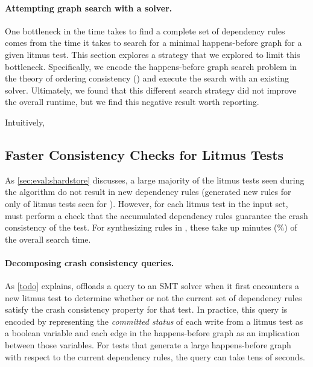 \paragraph{Attempting graph search with a \tord solver.}
One bottleneck in the time \depsynth takes to find a complete set of
dependency rules comes from the time it takes to search for a minimal
happens-before graph for a given litmus test.
This section explores a strategy that we explored to limit this bottleneck.
Specifically, we encode the happens-before graph search problem
in the theory of ordering consistency (\tord)
and execute the search with an existing \tord solver.
Ultimately, we found that this different search strategy did not 
improve the overall runtime, but we find this negative
result worth reporting.


Intuitively, %

\subsection{Faster Consistency Checks for Litmus Tests}
\label{s:improved-search}
As \cref{sec:eval:shardstore} discusses,
a large majority of the litmus tests seen during the \depsynth
algorithm do not result in new dependency rules
(\depsynth generated new rules for only \shardstoretestsused of \shardstoreinputtests
 litmus tests seen for \shardstore).
However, for each litmus test in the input set, \depsynth
must perform a check that the accumulated dependency rules
guarantee the crash consistency of the test.
For synthesizing rules in \shardstore,
these take up \shardstoreverificationminutes minutes (\shardstoreverificationpercent\%)
of the overall search time.

\paragraph{Decomposing crash consistency queries.}
As \cref{todo} explains, \depsynth offloads a query to an SMT
solver when it first encounters a new litmus test to determine
whether or not the current set of dependency rules satisfy the
crash consistency property for that test.
In practice, this query is encoded by representing the \textit{committed status}
of each write from a litmus test as a boolean variable
and each edge in the happens-before graph as an implication between those variables.
For tests that generate a large happens-before graph
with respect to the current dependency rules,
the query can take tens of seconds.

